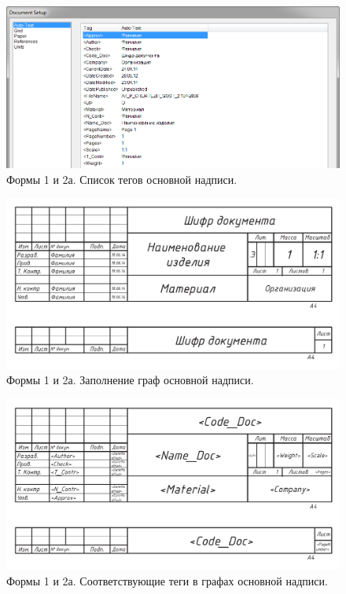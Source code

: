 \documentclass[14pt]{extreport}
\begin{document}
\begin{figure}[h]
	\centering
	\includegraphics[width=\textwidth]{ESKD_CHERTEZH}
	\caption{Формы 1 и 2а. Список тегов основной надписи.\label{ESKD_CHERTEZH}}
\end{figure}

\begin{figure}[h]
	\centering
	\includegraphics[width=\textwidth]{ESKD_CHERTEZH_without_tagname}
    \caption{Формы 1 и 2а. Заполнение граф основной надписи.\label{ESKD_CHERTEZH_without_tagname}}
\end{figure}

\begin{figure}[h]
	\centering
	\includegraphics[width=\textwidth]{ESKD_CHERTEZH_with_tagname}
	\caption{Формы 1 и 2а. Соответствующие теги в графах основной надписи.\label{ESKD_CHERTEZH_with_tagname}}
\end{figure}
\end{document}
